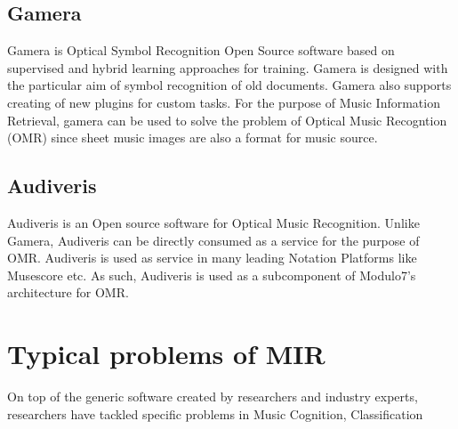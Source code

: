 \subsection{Gamera}

\noindent Gamera \cite{gamera} is Optical Symbol Recognition Open Source software based on supervised and hybrid learning approaches for training. Gamera is designed with the particular aim of symbol recognition of old documents. Gamera also supports creating of new plugins for custom tasks. For the purpose of Music Information Retrieval, gamera can be used to solve the problem of Optical Music Recogntion (OMR) since sheet music images are also a format for music source.

\subsection{Audiveris}

\noindent Audiveris is an Open source software for Optical Music Recognition. Unlike Gamera, Audiveris can be directly consumed as a service for the purpose of OMR.  Audiveris is used as service in many leading Notation Platforms like Musescore etc. As such, Audiveris is used as a subcomponent of Modulo7's architecture for OMR. 

\section{Typical problems of MIR}

On top of the generic software created by researchers and industry experts, researchers have tackled specific problems in Music Cognition, Classification 
